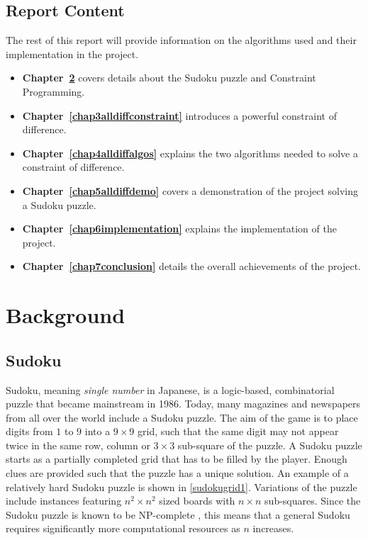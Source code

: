 \documentclass{l4proj}
\begin{document}
\section{Report Content}
The rest of this report will provide information on the algorithms used and their implementation in the project.
\begin{itemize}
\item \textbf{Chapter~\ref{chap2background}} covers details about the Sudoku puzzle and Constraint Programming.
\item \textbf{Chapter~\ref{chap3alldiffconstraint}} introduces a powerful constraint of difference.
\item \textbf{Chapter~\ref{chap4alldiffalgos}} explains the two algorithms needed to solve a constraint of difference.
\item \textbf{Chapter~\ref{chap5alldiffdemo}} covers a demonstration of the project solving a Sudoku puzzle.
\item \textbf{Chapter~\ref{chap6implementation}} explains the implementation of the project.
\item \textbf{Chapter~\ref{chap7conclusion}} details the overall achievements of the project.
\end{itemize}

\chapter{Background}
\label{chap2background}
\section{Sudoku}
\noindent Sudoku, meaning \textit{single number} in Japanese, is a logic-based, combinatorial puzzle that became mainstream in 1986. Today, many magazines and newspapers from all over the world include a Sudoku puzzle. The aim of the game is to place digits from $1$ to $9$ into a $9 \times 9$ grid, such that the same digit may not appear twice in the same row, column or $3\times 3$ sub-square of the puzzle. A Sudoku puzzle starts as a partially completed grid that has to be filled by the player. Enough clues are provided such that the puzzle has a unique solution. An example of a relatively hard Sudoku puzzle is shown in \ref{sudokugrid1}. Variations of the puzzle include instances featuring $n^2\times n^2$ sized boards with $n\times n$ sub-squares. Since the Sudoku puzzle is known to be NP-complete \cite{colbourn1984complexity}, this means that a general Sudoku requires significantly more computational resources as $n$ increases.
\end{document}
